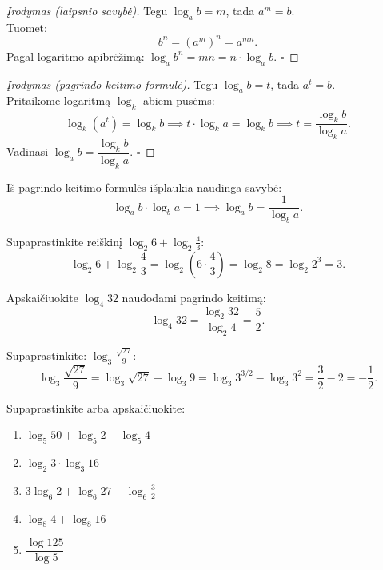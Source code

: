 \begin{proof}[Įrodymas (laipsnio savybė)]
Tegu $\log_a b = m$, tada $a^m = b$.\\
Tuomet:
\[
b^n = (a^m)^n = a^{mn}.
\]
Pagal logaritmo apibrėžimą: $\log_a b^n = mn = n \cdot \log_a b$. $\square$
\end{proof}

\begin{proof}[Įrodymas (pagrindo keitimo formulė)]
Tegu $\log_a b = t$, tada $a^t = b$.\\
Pritaikome logaritmą $\log_k$ abiem pusėms:
\[
\log_k(a^t) = \log_k b \implies t \cdot \log_k a = \log_k b \implies t = \frac{\log_k b}{\log_k a}.
\]
Vadinasi $\log_a b = \dfrac{\log_k b}{\log_k a}$. $\square$
\end{proof}

\begin{remark}
Iš pagrindo keitimo formulės išplaukia naudinga savybė:
\[
\log_a b \cdot \log_b a = 1 \implies \log_a b = \frac{1}{\log_b a}.
\]
\end{remark}

\begin{example}
Supaprastinkite reiškinį $\log_2 6 + \log_2 \frac{4}{3}$:
\[
\log_2 6 + \log_2 \frac{4}{3} = \log_2 \left(6 \cdot \frac{4}{3}\right) = \log_2 8 = \log_2 2^3 = 3.
\]
\end{example}

\begin{example}
Apskaičiuokite $\log_4 32$ naudodami pagrindo keitimą:
\[
\log_4 32 = \frac{\log_2 32}{\log_2 4} = \frac{5}{2}.
\]
\end{example}

\begin{example}
Supaprastinkite: $\log_3 \frac{\sqrt{27}}{9}$:
\[
\log_3 \frac{\sqrt{27}}{9} = \log_3 \sqrt{27} - \log_3 9 = \log_3 3^{3/2} - \log_3 3^2 = \frac{3}{2} - 2 = -\frac{1}{2}.
\]
\end{example}

\begin{exercise}
Supaprastinkite arba apskaičiuokite:
\begin{enumerate}[label=\arabic*.]
    \item $\log_5 50 + \log_5 2 - \log_5 4$
    \item $\log_2 3 \cdot \log_3 16$
    \item $3\log_6 2 + \log_6 27 - \log_6 \frac{3}{2}$
    \item $\log_8 4 + \log_8 16$
    \item $\dfrac{\log 125}{\log 5}$
\end{enumerate}
\end{exercise}

